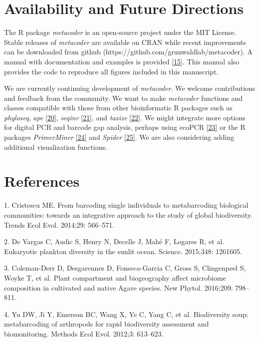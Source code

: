 \documentclass[10pt,letterpaper]{article}
\begin{document}
\section*{Availability and Future
Directions}\label{availability-and-future-directions}

The R package \emph{metacoder} is an open-source project under the MIT
License. Stable releases of \emph{metacoder} are available on CRAN while
recent improvements can be downloaded from github
(https://github.com/grunwaldlab/metacoder). A manual with documentation
and examples is provided \hyperref[csl:15]{[15]}. This manual
also provides the code to reproduce all figures included in this
manuscript.

We are currently continuing development of \emph{metacoder}. We welcome
contributions and feedback from the community. We want to make
\emph{metacoder} functions and classes compatible with those from other
bioinformatic R packages such as \emph{phyloseq}, \emph{ape}
\hyperref[csl:20]{[20]}, \emph{seqinr} \hyperref[csl:21]{[21]}, and
\emph{taxize} \hyperref[csl:22]{[22]}. We might integrate more
options for digital PCR and barcode gap analysis, perhaps using ecoPCR
\hyperref[csl:23]{[23]} or the R packages \emph{PrimerMiner}
\hyperref[csl:24]{[24]} and \emph{Spider} \hyperref[csl:25]{[25]}.
We are also considering adding additional visualization functions.

\section*{References}
\label{csl:1}1. Cristescu ME. {From barcoding single individuals to metabarcoding biological communities: towards an integrative approach to the study of global biodiversity}. Trends Ecol Evol. 2014;29: 566–571.

\label{csl:2}2. De Vargas C, Audic S, Henry N, Decelle J, Mah{\'e} F, Logares R, et al. {Eukaryotic plankton diversity in the sunlit ocean}. Science. 2015;348: 1261605.

\label{csl:3}3. Coleman-Derr D, Desgarennes D, Fonseca-Garcia C, Gross S, Clingenpeel S, Woyke T, et al. {Plant compartment and biogeography affect microbiome composition in cultivated and native Agave species}. New Phytol. 2016;209: 798–811.

\label{csl:4}4. Yu DW, Ji Y, Emerson BC, Wang X, Ye C, Yang C, et al. {Biodiversity soup: metabarcoding of arthropods for rapid biodiversity assessment and biomonitoring}. Methods Ecol Evol. 2012;3: 613–623.
\end{document}
